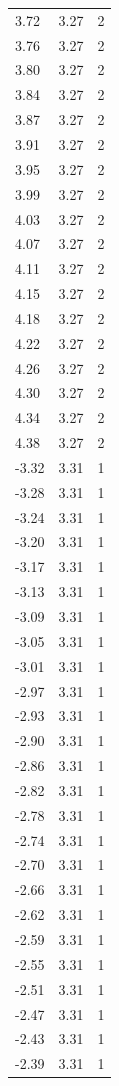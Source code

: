 \begin{longtable}{lrr}
  3.72 & 3.27 & 2 \\
  3.76 & 3.27 & 2 \\
  3.80 & 3.27 & 2 \\
  3.84 & 3.27 & 2 \\
  3.87 & 3.27 & 2 \\
  3.91 & 3.27 & 2 \\
  3.95 & 3.27 & 2 \\
  3.99 & 3.27 & 2 \\
  4.03 & 3.27 & 2 \\
  4.07 & 3.27 & 2 \\
  4.11 & 3.27 & 2 \\
  4.15 & 3.27 & 2 \\
  4.18 & 3.27 & 2 \\
  4.22 & 3.27 & 2 \\
  4.26 & 3.27 & 2 \\
  4.30 & 3.27 & 2 \\
  4.34 & 3.27 & 2 \\
  4.38 & 3.27 & 2 \\
  -3.32 & 3.31 & 1 \\
  -3.28 & 3.31 & 1 \\
  -3.24 & 3.31 & 1 \\
  -3.20 & 3.31 & 1 \\
  -3.17 & 3.31 & 1 \\
  -3.13 & 3.31 & 1 \\
  -3.09 & 3.31 & 1 \\
  -3.05 & 3.31 & 1 \\
  -3.01 & 3.31 & 1 \\
  -2.97 & 3.31 & 1 \\
  -2.93 & 3.31 & 1 \\
  -2.90 & 3.31 & 1 \\
  -2.86 & 3.31 & 1 \\
  -2.82 & 3.31 & 1 \\
  -2.78 & 3.31 & 1 \\
  -2.74 & 3.31 & 1 \\
  -2.70 & 3.31 & 1 \\
  -2.66 & 3.31 & 1 \\
  -2.62 & 3.31 & 1 \\
  -2.59 & 3.31 & 1 \\
  -2.55 & 3.31 & 1 \\
  -2.51 & 3.31 & 1 \\
  -2.47 & 3.31 & 1 \\
  -2.43 & 3.31 & 1 \\
  -2.39 & 3.31 & 1 \\

\end{longtable}
